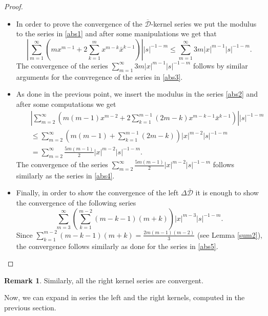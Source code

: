 \documentclass[reqno,11pt]{amsart}
\numberwithin{equation}{section}
\theoremstyle{definition}
\newtheorem{remark}[theorem]{{\bf Remark}}
\begin{document}
\begin{proof}
\begin{itemize}
\item In order to prove the convergence of the $ \mathcal{\overline{D}}$-kernel series we put the modulus to the series in \eqref{abs1} and after some manipulations we get that
$$  \left| \sum_{m=1}^\infty \left(mx^{m-1}  +2  \sum_{k=1}^{m} x^{m-k} \bar{x}^{k-1}   \right) \right| |s|^{-1-m} \leq \sum_{m=1}^\infty 3m |x|^{m-1} |s|^{-1-m}.$$
The convergence of the series $\sum_{m=1}^\infty 3m |x|^{m-1} |s|^{-1-m}$ follows by similar arguments for the convregence of the series in \eqref{abs3}.
\item As done in the previous point, we insert the modulus in the series \eqref{abs2} and after some computations we get
\begin{eqnarray*}
&& \left|\sum_{m=2}^\infty \left(m(m-1)x^{m-2}+2  \sum_{k=1}^{m-1} (2m-k)x^{m-k-1}\bar{x}^{k-1}\right)\right| |s|^{-1-m} \\
&& \leq \sum_{m=2}^\infty  \left(m(m-1)+ \sum_{k=1}^{m-1} (2m-k) \right)|x|^{m-2}|s|^{-1-m}\\
&&=  \sum_{m=2}^\infty \frac{5m (m-1)}{2} |x|^{m-2}|s|^{-1-m}.
\end{eqnarray*}
The convergence of the series $\sum_{m=2}^\infty \frac{5m (m-1)}{2} |x|^{m-2}|s|^{-1-m}$ follows similarly as the series in \eqref{abs4}.
\item Finally, in order to show the convergence of the left $ \Delta \mathcal{\overline{D}}$ it is enough to show the convergence of the following series
$$ \sum_{m=3}^\infty \left( \sum_{k=1}^{m-2} (m-k-1)(m+k) \right) |x|^{m-3} |s|^{-1-m}.$$
Since $ \sum_{k=1}^{m-2} (m-k-1)(m+k)= \frac{2m(m-1)(m-2)}{3}$ (see Lemma \ref{sum2}), the convergence follows similarly as done for the series in \eqref{abs5}.
\end{itemize}
\end{proof}
\begin{remark}
Similarly, all the right kernel series are convergent.
\end{remark}
Now, we can expand in series the left and the right kernels, computed in the previous section.
\end{document}
